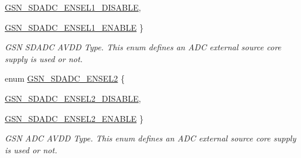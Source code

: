 \begin{DoxyCompactItemize}
\hyperlink{a00652_gga7c8cd0e1bbc6163fd01b12c7f31f0550a7f18f093a813a23aac7a7602cec80767}{GSN\_\-SDADC\_\-ENSEL1\_\-DISABLE}, 
\par
\hyperlink{a00652_gga7c8cd0e1bbc6163fd01b12c7f31f0550a20f123d417c8be249c802178812e6f25}{GSN\_\-SDADC\_\-ENSEL1\_\-ENABLE}
 \}
\begin{DoxyCompactList}\small\item\em GSN SDADC AVDD Type. This enum defines an ADC external source core supply is used or not. \end{DoxyCompactList}\item 
enum \hyperlink{a00652_ga940370ff6d2765c622f7687f6e6eee6a}{GSN\_\-SDADC\_\-ENSEL2} \{ \par
\hyperlink{a00652_gga940370ff6d2765c622f7687f6e6eee6aafd1575cfcab6f04a11fb0a7227ef7e85}{GSN\_\-SDADC\_\-ENSEL2\_\-DISABLE}, 
\par
\hyperlink{a00652_gga940370ff6d2765c622f7687f6e6eee6aa9f10996b807e2d9a21309e1b2b888210}{GSN\_\-SDADC\_\-ENSEL2\_\-ENABLE}
 \}
\begin{DoxyCompactList}\small\item\em GSN ADC AVDD Type. This enum defines an ADC external source core supply is used or not. \end{DoxyCompactList}\end{DoxyCompactItemize}
